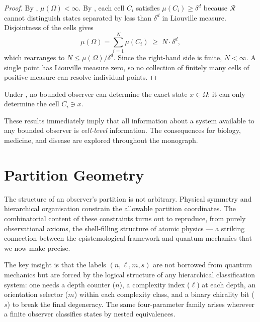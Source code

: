 \begin{proof}
By , $\mu(\Omega) < \infty$.  By
, each cell $C_i$ satisfies $\mu(C_i) \geq \delta^d$
because $\mathcal{R}$ cannot distinguish states separated by less than $\delta^d$
in Liouville measure.  Disjointness of the cells gives
\[
  \mu(\Omega) = \sum_{i=1}^{N} \mu(C_i) \;\geq\; N \cdot \delta^d ,
\]
which rearranges to $N \leq \mu(\Omega)/\delta^d$.  Since the right-hand side
is finite, $N < \infty$.  A single point has Liouville measure zero, so no
collection of finitely many cells of positive measure can resolve individual
points.
\end{proof}

\begin{corollary}
\label{cor:point-resolution}
Under , no bounded observer can
determine the exact state $x \in \Omega$; it can only determine the cell
$C_i \ni x$.
\end{corollary}

These results immediately imply that all information about a system available
to any bounded observer is \emph{cell-level} information.  The consequences for
biology, medicine, and disease are explored throughout the monograph.

\section{Partition Geometry}
\label{sec:partition-geometry}

The structure of an observer's partition is not arbitrary.  Physical symmetry
and hierarchical organisation constrain the allowable partition coordinates.
The combinatorial content of these constraints turns out to reproduce, from
purely observational axioms, the shell-filling structure of atomic physics —
a striking connection between the epistemological framework and quantum
mechanics that we now make precise.

The key insight is that the labels $(n, \ell, m, s)$ are not borrowed from
quantum mechanics but are forced by the logical structure of any hierarchical
classification system: one needs a depth counter ($n$), a complexity index
($\ell$) at each depth, an orientation selector ($m$) within each complexity
class, and a binary chirality bit ($s$) to break the final degeneracy.  The
same four-parameter family arises wherever a finite observer classifies states
by nested equivalences.

